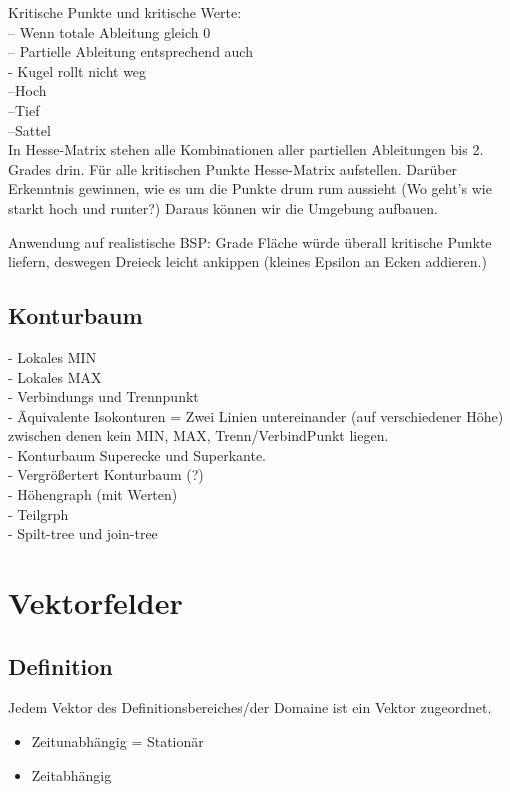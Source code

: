 \documentclass{article}
\begin{document}
Kritische Punkte und kritische Werte:\\
-- Wenn totale Ableitung gleich 0\\
-- Partielle Ableitung entsprechend auch\\
- Kugel rollt nicht weg\\
--Hoch\\
--Tief\\
--Sattel\\

In Hesse-Matrix stehen alle Kombinationen aller partiellen Ableitungen bis 2. Grades drin.
Für alle kritischen Punkte Hesse-Matrix aufstellen. Darüber Erkenntnis gewinnen, wie es um die Punkte drum rum aussieht (Wo geht's wie starkt hoch und runter?) Daraus können wir die Umgebung aufbauen.

Anwendung auf realistische BSP: Grade Fläche würde überall kritische Punkte liefern, deswegen Dreieck leicht ankippen (kleines Epsilon an Ecken addieren.)

\subsection{Konturbaum}
- Lokales MIN\\
- Lokales MAX\\
- Verbindungs und Trennpunkt\\

- Äquivalente Isokonturen = Zwei Linien untereinander (auf verschiedener Höhe) zwischen denen kein MIN, MAX, Trenn/VerbindPunkt liegen.\\

- Konturbaum Superecke und Superkante.\\

- Vergrößertert Konturbaum (?)\\
- Höhengraph (mit Werten)\\
- Teilgrph\\
- Spilt-tree und join-tree\\


\pagebreak
\section{Vektorfelder}
\subsection{Definition}
Jedem Vektor des Definitionsbereiches/der Domaine ist ein Vektor zugeordnet.

\begin{itemize}[noitemsep]
	\item Zeitunabhängig = Stationär	
	\item Zeitabhängig
\end{itemize}
\end{document}
